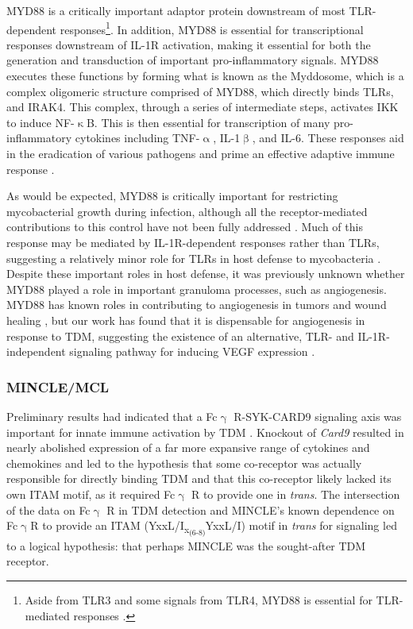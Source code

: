 MYD88 is a critically important adaptor protein downstream of most TLR\hyp{}dependent responses\footnote{Aside from TLR3 and some signals from TLR4, MYD88 is essential for TLR\hyp{}mediated responses \citep{Takeda2004, Kawasaki2014}.}. In addition, MYD88 is essential for transcriptional responses downstream of IL\hyp{}1R activation, making it essential for both the generation and transduction of important pro\hyp{}inflammatory signals. MYD88 executes these functions by forming what is known as the Myddosome, which is a complex oligomeric structure comprised of MYD88, which directly binds TLRs, and IRAK4. This complex, through a series of intermediate steps, activates IKK to induce NF\hyp{}$\upkappa$B. This is then essential for transcription of many pro\hyp{}inflammatory cytokines including TNF\hyp{}$\upalpha$, IL\hyp{}1$\upbeta$, and IL\hyp{}6. These responses aid in the eradication of various pathogens and prime an effective adaptive immune response \citep{Balka2019}. 

As would be expected, MYD88 is critically important for restricting mycobacterial growth during infection, although all the receptor\hyp{}mediated contributions to this control have not been fully addressed \citep{Berod2014, Shi2003, Scanga2004, Holscher2008, Sugawara2003, Cervantes2017, Underhill1999, Hosseini2021}. Much of this response may be mediated by IL\hyp{}1R\hyp{}dependent responses rather than TLRs, suggesting a relatively minor role for TLRs in host defense to mycobacteria \citep{Fremond2007, Holscher2008}. Despite these important roles in host defense, it was previously unknown whether MYD88 played a role in important granuloma processes, such as angiogenesis. MYD88 has known roles in contributing to angiogenesis in tumors and wound healing \citep{Macedo2007, Zhang2020b}, but our work has found that it is dispensable for angiogenesis in response to TDM, suggesting the existence of an alternative, TLR\hyp{} and IL\hyp{}1R\hyp{}independent signaling pathway for inducing VEGF expression \citep{Walton2018}.

\subsubsection{MINCLE/MCL}

Preliminary results had indicated that a Fc$\upgamma$ R\hyp{}SYK\hyp{}CARD9 signaling axis was important for innate immune activation by TDM \citep{Werninghaus2009}. Knockout of \textit{Card9} resulted in nearly abolished expression of a far more expansive range of cytokines and chemokines and led to the hypothesis that some co\hyp{}receptor was actually responsible for directly binding TDM and that this co\hyp{}receptor likely lacked its own ITAM motif, as it required Fc$\upgamma$ R to provide one in \textit{trans}. The intersection of the data on Fc$\upgamma$ R in TDM detection \citep{Werninghaus2009} and MINCLE's known dependence on Fc$\upgamma$R to provide an ITAM (YxxL/I\textsubscript{x\textsubscript{(6\hyp{}8)}}YxxL/I) motif in \textit{trans} for signaling \citep{Yamasaki2008} led to a logical hypothesis: that perhaps MINCLE was the sought\hyp{}after TDM receptor.

